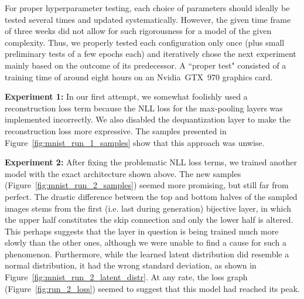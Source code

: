 For proper hyperparameter testing, each choice of parameters should ideally be tested several times and updated systematically. However, the given time frame of three weeks did not allow for such rigorousness for a model of the given complexity. Thus, we properly tested each configuration only once (plus small preliminary tests of a few epochs each) and iteratively chose the next experiment mainly based on the outcome of its predecessor. A ``proper test" consisted of a training time of around eight hours on an Nvidia~GTX~970 graphics card.

\textbf{Experiment 1:} In our first attempt, we somewhat foolishly used a reconstruction loss term because the NLL loss for the max-pooling layers was implemented incorrectly. We also disabled the dequantization layer to make the reconstruction loss more expressive. The samples presented in Figure~\ref{fig:mnist_run_1_samples} show that this approach was unwise.

\textbf{Experiment 2:} After fixing the problematic NLL loss terms, we trained another model with the exact architecture shown above. The new samples (Figure~\ref{fig:mnist_run_2_samples}) seemed more promising, but still far from perfect. The drastic difference between the top and bottom halves of the sampled images stems from the first (i.e. last during generation) bijective layer, in which the upper half constitutes the skip connection and only the lower half is altered. This perhaps suggests that the layer in question is being trained much more slowly than the other ones, although we were unable to find a cause for such a phenomenon. Furthermore, while the learned latent distribution did resemble a normal distribution, it had the wrong standard deviation, as shown in Figure~\ref{fig:mnist_run_2_latent_distr}. At any rate, the loss graph (Figure~\ref{fig:run_2_loss}) seemed to suggest that this model had reached its peak.

